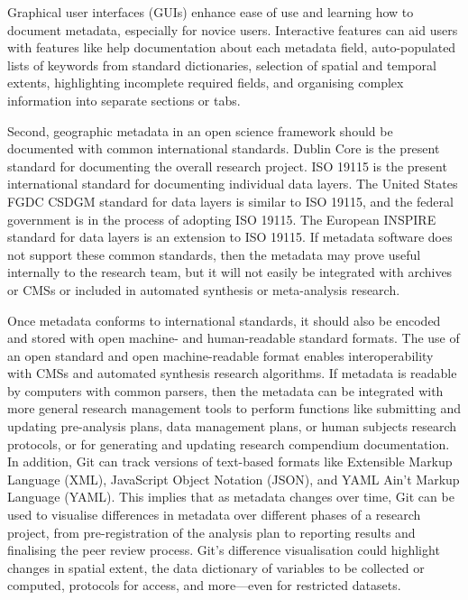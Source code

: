 \documentclass{isprs} %
\begin{document}
Graphical user interfaces (GUIs) enhance ease of use and learning how to document metadata, especially for novice users.
Interactive features can aid users with features like help documentation about each metadata field, auto-populated lists of keywords from standard dictionaries, selection of spatial and temporal extents, highlighting incomplete required fields, and organising complex information into separate sections or tabs.

Second, geographic metadata in an open science framework should be documented with common international standards. 
Dublin Core is the present standard for documenting the overall research project. 
ISO 19115 is the present international standard for documenting individual data layers.
The United States FGDC CSDGM standard for data layers is similar to ISO 19115, and the federal government is in the process of adopting ISO 19115.
The European INSPIRE standard for data layers is an extension to ISO 19115. 
If metadata software does not support these common standards, then the metadata may prove useful internally to the research team, but it will not easily be integrated with archives or CMSs or included in automated synthesis or meta-analysis research.

Once metadata conforms to international standards, it should also be encoded and stored with open machine- and human-readable standard formats. 
The use of an open standard and open machine-readable format enables interoperability with CMSs and automated synthesis research algorithms.
If metadata is readable by computers with common parsers, then the metadata can be integrated with more general research management tools to perform functions like submitting and updating pre-analysis plans, data management plans, or human subjects research protocols, or for generating and updating research compendium documentation.
In addition, Git can track versions of text-based formats like Extensible Markup Language (XML), JavaScript Object Notation (JSON), and YAML Ain't Markup Language (YAML).
This implies that as metadata changes over time, Git can be used to visualise differences in metadata over different phases of a research project, from pre-registration of the analysis plan to reporting results and finalising the peer review process.
Git's difference visualisation could highlight changes in spatial extent, the data dictionary of variables to be collected or computed, protocols for access, and more---even for restricted datasets.
\end{document}
